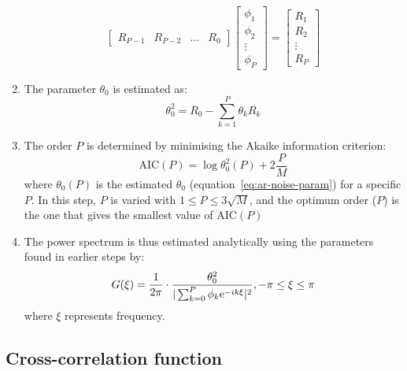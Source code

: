 \begin{enumerate}
\begin{equation}
\begin{bmatrix}
            R_{P-1} & R_{P-2} & \dots & R_{0}
          \end{bmatrix}
          \begin{bmatrix}
            \phi_{1} \\
            \phi_{2} \\
            \vdots \\
            \phi_{P}
          \end{bmatrix}
          =
          \begin{bmatrix}
            R_{1} \\
            R_{2} \\
            \vdots \\
            R_{P}
          \end{bmatrix}
        \end{equation}
  \item The parameter $\theta_{0}$ is estimated as:
        \begin{equation}
          \label{eq:ar-noise-param}
          \theta_{0}^{2} = R_{0} - \sum_{k=1}^{P}\theta_{k}R_{k}
        \end{equation}
  \item The order $P$ is determined by minimising the Akaike information criterion:
        \begin{equation}
          \label{eq:ar-aic}
          \mathrm{AIC}(P) = \log \theta_{0}^{2}(P) + 2 \frac{P}{M}
        \end{equation}
        where $\theta_{0}(P)$ is the estimated $\theta_{0}$ (equation~\ref{eq:ar-noise-param}) for a specific $P$.
        In this step, $P$ is varied with $1 \leq P \leq 3 \sqrt{M}$, and the optimum order ($P$) is the one that gives the smallest value of $\mathrm{AIC}(P)$
   \item The power spectrum is thus estimated analytically using the parameters found in earlier steps by:
        \begin{equation}
          \label{eq:ar-power-spectrum}
          G(\xi) = \frac{1}{2 \pi} \cdot \frac{\theta_{0}^{2}}{|\sum_{k=0}^{P}\phi_{k}\mathrm{e}^{-ik\xi}|^{2}}, -\pi \leq \xi \leq \pi
        \end{equation}
        where $\xi$ represents frequency.
\end{enumerate}


\subsection{Cross-correlation function}
\label{subsec:methods-computational-xcf}

